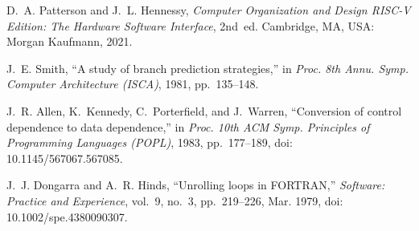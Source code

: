  D.~A. Patterson and J.~L. Hennessy, \emph{Computer Organization
and Design RISC-V Edition: The Hardware Software Interface}, 2nd~ed. Cambridge, MA, USA:
Morgan Kaufmann, 2021.

 J.~E. Smith, ``A study of branch prediction strategies,'' in
\emph{Proc. 8th Annu. Symp. Computer Architecture (ISCA)}, 1981, pp.~135--148.

 J.~R. Allen, K.~Kennedy, C.~Porterfield, and J.~Warren, ``Conversion
of control dependence to data dependence,'' in \emph{Proc. 10th ACM Symp. Principles of
Programming Languages (POPL)}, 1983, pp.~177--189, doi: 10.1145/567067.567085.

 J.~J. Dongarra and A.~R. Hinds, ``Unrolling loops in FORTRAN,''
\emph{Software: Practice and Experience}, vol.~9, no.~3, pp.~219--226, Mar. 1979,
doi: 10.1002/spe.4380090307.
